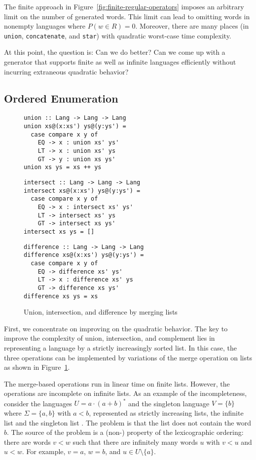 The finite approach in Figure~\ref{fig:finite-regular-operators}
imposes an arbitrary limit on the number of generated words. This
limit can lead to omitting words in nonempty languages where $P (w\in
R) = 0$. Moreover, there are many places (in \texttt{union},
\texttt{concatenate}, and \texttt{star}) with quadratic worst-case
time complexity. 

At this point, the question is: Can we do better? Can we come up with
a generator that supports finite as well as infinite languages
efficiently without incurring extraneous quadratic behavior?


\subsection{Ordered Enumeration}
\label{sec:ordered-enumeration}
\begin{figure}[tp]
\begin{lstlisting}
union :: Lang -> Lang -> Lang
union xs@(x:xs') ys@(y:ys') =
  case compare x y of
    EQ -> x : union xs' ys'
    LT -> x : union xs' ys
    GT -> y : union xs ys'
union xs ys = xs ++ ys
\end{lstlisting}

\begin{lstlisting}
intersect :: Lang -> Lang -> Lang
intersect xs@(x:xs') ys@(y:ys') =
  case compare x y of
    EQ -> x : intersect xs' ys'
    LT -> intersect xs' ys
    GT -> intersect xs ys'
intersect xs ys = []
\end{lstlisting}

\begin{lstlisting}
difference :: Lang -> Lang -> Lang
difference xs@(x:xs') ys@(y:ys') =
  case compare x y of
    EQ -> difference xs' ys'
    LT -> x : difference xs' ys
    GT -> difference xs ys'
difference xs ys = xs
\end{lstlisting}
  \caption{Union, intersection, and difference by merging lists}
  \label{fig:merging-lists}
\end{figure}

First, we concentrate on improving on the quadratic behavior. The key
to improve the complexity of union, intersection, and complement lies
in representing a language by a strictly increasingly sorted list.
In this case, the three operations can be implemented by variations of
the merge operation on lists as shown in
Figure~\ref{fig:merging-lists}.

The merge-based operations run in linear time on finite
lists. However, the operations are incomplete on infinite lists. As
an example of the incompleteness, consider the languages $U = a\cdot
(a+b)^*$ and the singleton language $V = \{b\}$ where $\Sigma = \{a, b\}$
with $a<b$, represented as strictly increasing lists, the infinite
list  and the singleton list . The problem is that
the list  does not contain the word $b$. The source
of the problem is a (non-) property of the lexicographic ordering:
there are words $v<w$ such that there are infinitely many words $u$
with $v<u$ and $u<w$. For example, $v=a$, $w=b$, and $u\in U \setminus \{a\}$.




